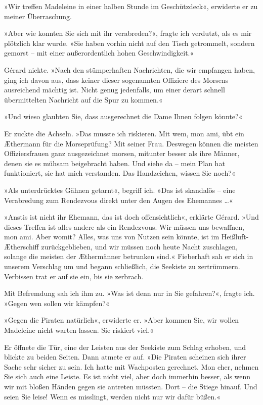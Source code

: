 »Wir treffen Madeleine in einer halben Stunde im Geschützdeck«,
erwiderte er zu meiner Überraschung.

»Aber wie konnten Sie sich mit ihr verabreden?«, fragte ich
verdutzt, als es mir plötzlich klar wurde. »Sie haben vorhin nicht
auf den Tisch getrommelt, sondern gemorst – mit einer
außerordentlich hohen Geschwindigkeit.«

Gérard nickte. »Nach den stümperhaften Nachrichten, die wir
empfangen haben, ging ich davon aus, dass keiner dieser sogenannten
Offiziere des Morsens ausreichend mächtig ist. Nicht genug
jedenfalls, um einer derart schnell übermittelten Nachricht auf die
Spur zu kommen.«

»Und wieso glaubten Sie, dass ausgerechnet die Dame Ihnen folgen
könnte?«

Er zuckte die Achseln. »Das musste ich riskieren. Mit wem, mon ami,
übt ein Æthermann für die Morseprüfung? Mit seiner Frau. Deswegen
können die meisten Offiziersfrauen ganz ausgezeichnet morsen,
mitunter besser als ihre Männer, denen sie es mühsam beigebracht
haben. Und siehe da – mein Plan hat funktioniert, sie hat mich
verstanden. Das Handzeichen, wissen Sie noch?«

»Als unterdrücktes Gähnen getarnt«, begriff ich. »Das ist skandalös
– eine Verabredung zum Rendezvous direkt unter den Augen des
Ehemannes \ldots{}«

»Anstis ist nicht ihr Ehemann, das ist doch offensichtlich«,
erklärte Gérard. »Und dieses Treffen ist alles andere als ein
Rendezvous. Wir müssen uns bewaffnen, mon ami. Aber womit? Alles,
was uns von Nutzen sein könnte, ist im Heißluft-Ætherschiff
zurückgeblieben, und wir müssen noch heute Nacht zuschlagen,
solange die meisten der Æthermänner betrunken sind.« Fieberhaft sah
er sich in unserem Verschlag um und begann schließlich, die
Seekiste zu zertrümmern. Verbissen trat er auf sie ein, bis sie
zerbrach.

Mit Befremdung sah ich ihm zu. »Was ist denn nur in Sie gefahren?«,
fragte ich. »Gegen wen sollen wir kämpfen?«

»Gegen die Piraten natürlich«, erwiderte er. »Aber kommen Sie, wir
wollen Madeleine nicht warten lassen. Sie riskiert viel.«

Er öffnete die Tür, eine der Leisten aus der Seekiste zum Schlag
erhoben, und blickte zu beiden Seiten. Dann atmete er auf. »Die
Piraten scheinen sich ihrer Sache sehr sicher zu sein. Ich hatte
mit Wachposten gerechnet. Mon cher, nehmen Sie sich auch eine
Leiste. Es ist nicht viel, aber doch immerhin besser, als wenn wir
mit bloßen Händen gegen sie antreten müssten. Dort – die Stiege
hinauf. Und seien Sie leise! Wenn es misslingt, werden nicht nur
wir dafür büßen.«

